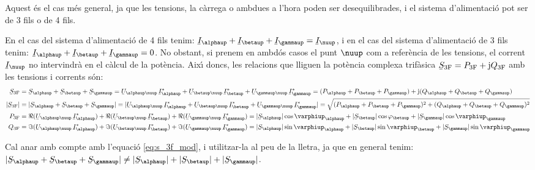 Aquest \'{e}s el cas m\'{e}s general, ja que les tensions, la c\`{a}rrega o
ambdues a l'hora  poden ser desequilibrades, i el sistema
d'alimentaci\'{o} pot ser de 3 fils o de 4 fils.

En el cas del sistema d'alimentaci\'{o} de 4 fils tenim:
$\cmplx{I}_\alphaup+\cmplx{I}_\betaup+\cmplx{I}_\gammaup=\cmplx{I}_\nuup$, i
en el cas del sistema d'alimentaci\'{o} de 3 fils tenim:
$\cmplx{I}_\alphaup+\cmplx{I}_\betaup+\cmplx{I}_\gammaup=0$. No obstant,
si prenem en ambd\'{o}s casos el punt $\nuup$ com a refer\`{e}ncia de les
tensions, el corrent $\cmplx{I}_\nuup$ no intervindr\`{a} en el c\`{a}lcul de
la pot\`{e}ncia. Aix\'{\i} doncs, les relacions que lliguen la pot\`{e}ncia
complexa trif\`{a}sica $\cmplx{S}\ped{3F} = P\ped{3F} + \ju Q\ped{3F}$
amb les tensions i corrents s\'{o}n:
\begin{align}
    \cmplx{S}\ped{3F} &= \cmplx{S}_\alphaup + \cmplx{S}_\betaup + \cmplx{S}_\gammaup =
     \cmplx{U}_{\alphaup\nuup}\, \cmplx{I}_\alphaup^* +
    \cmplx{U}_{\betaup\nuup} \,\cmplx{I}_\betaup^* +  \cmplx{U}_{\gammaup\nuup}\, \cmplx{I}_\gammaup^* =
    (P_\alphaup + P_\betaup + P_\gammaup) + \ju (Q_\alphaup + Q_\betaup + Q_\gammaup) \label{eq:s_3f} \\
    |\cmplx{S}\ped{3F}| &= |\cmplx{S}_\alphaup + \cmplx{S}_\betaup + \cmplx{S}_\gammaup| =
    |\cmplx{U}_{\alphaup\nuup}\, \cmplx{I}_\alphaup^* +
    \cmplx{U}_{\betaup\nuup}\, \cmplx{I}_\betaup^* +  \cmplx{U}_{\gammaup\nuup} \,\cmplx{I}_\gammaup^*| =
    \sqrt{(P_\alphaup + P_\betaup + P_\gammaup)^2 + (Q_\alphaup + Q_\betaup + Q_\gammaup)^2} \label{eq:s_3f_mod} \\
    P\ped{3F} &= \Re(\cmplx{U}_{\alphaup\nuup} \,\cmplx{I}_\alphaup^*) +
    \Re(\cmplx{U}_{\betaup\nuup} \,\cmplx{I}_\betaup^*) +  \Re(\cmplx{U}_{\gammaup\nuup}\,
    \cmplx{I}_\gammaup^*) = |\cmplx{S}_\alphaup| \cos \varphiup_\alphaup + |\cmplx{S}_\betaup| \cos
    \varphi_\betaup + |\cmplx{S}_\gammaup| \cos \varphiup_\gammaup \\
    Q\ped{3F} &= \Im(\cmplx{U}_{\alphaup\nuup} \,\cmplx{I}_\alphaup^*) +
    \Im(\cmplx{U}_{\betaup\nuup} \,\cmplx{I}_\betaup^*) +  \Im(\cmplx{U}_{\gammaup\nuup}\,
    \cmplx{I}_\gammaup^*) = |\cmplx{S}_\alphaup| \sin \varphiup_\alphaup + |\cmplx{S}_\betaup| \sin
    \varphiup_\betaup + |\cmplx{S}_\gammaup| \sin \varphiup_\gammaup
\end{align}

Cal anar amb compte amb l'equaci\'{o} \eqref{eq:s_3f_mod}, i utilitzar-la al
peu de la lletra, ja
que en general tenim: $|\cmplx{S}_\alphaup + \cmplx{S}_\betaup + \cmplx{S}_\gammaup| \neq
|\cmplx{S}_\alphaup| + |\cmplx{S}_\betaup| + |\cmplx{S}_\gammaup|$.

